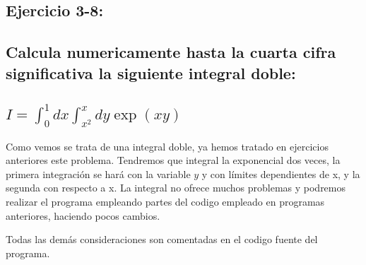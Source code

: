 \documentclass[12pt,thmsa]{article}
\begin{document}
\subsection{Ejercicio 3-8:}

\subsection{Calcula numericamente hasta la cuarta cifra significativa la
siguiente integral doble:}

\subsection{$I=\int\nolimits_{0}^{1}dx\int\nolimits_{x^{2}}^{x}dy\exp (xy)$}

Como vemos se trata de una integral doble, ya hemos tratado en ejercicios
anteriores este problema. Tendremos que integral la exponencial dos veces,
la primera integraci\'{o}n se har\'{a} con la variable $y$ y con l\'{i}mites
dependientes de x, y la segunda con respecto a x. La integral no ofrece
muchos problemas y podremos realizar el programa empleando partes del codigo
empleado en programas anteriores, haciendo pocos cambios.

\vspace{1pt}

Todas las dem\'{a}s consideraciones son comentadas en el codigo fuente del
programa.
\end{document}
